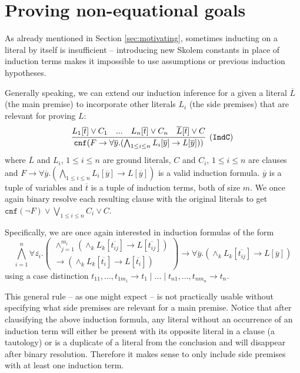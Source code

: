 
\section{Proving non-equational goals}
As already mentioned in Section \ref{sec:motivating}, sometimes inducting on a literal by itself is insufficient -- introducing new Skolem constants in place of induction terms makes it impossible to use assumptions or previous induction hypotheses.

Generally speaking, we can extend our induction inference for a given a literal $\overline{L}$ (the main premise) to incorporate other literals $L_i$ (the side premises) that are relevant for proving $L$:
\begin{equation*}\label{eq:multind}
\infer[\small{\tt (IndC)}]{\mathtt{cnf}(F \rightarrow \forall \overline{y}.(\bigwedge_{1\le i\le n}L_i[\overline{y}]\rightarrow L[\overline{y}]))}{L_1[\overline{t}]\lor C_1\quad...\quad L_n[\overline{t}]\lor C_n\quad\overline{L}[\overline{t}] \lor C}
\end{equation*}
where $\overline{L}$ and $L_i$, $1\le i\le n$ are ground literals, $C$ and $C_i$, $1\le i\le n$ are clauses and $F \rightarrow \forall \overline{y}.(\bigwedge_{1\le i\le n}L_i[\overline{y}]\rightarrow L[\overline{y}])$ is a valid induction formula. $\overline{y}$ is a tuple of variables and $\overline{t}$ is a tuple of induction terms, both of size $m$. We once again binary resolve each resulting clause with the original literals to get $\mathtt{cnf}(\lnot F) \lor\bigvee_{1\le i\le n} C_i\lor C$.

Specifically, we are once again interested in induction formulas of the form
$$\bigwedge_{i=1}^{n}\forall \overline{z_i}.\begin{pmatrix}\wedge_{j=1}^{m_i}(\wedge_kL_k[\overline{t_{ij}}]\rightarrow L[\overline{t_{ij}}])\\\rightarrow (\wedge_kL_k[\overline{t_i}]\rightarrow L[\overline{t_i}])\end{pmatrix}\rightarrow \forall \overline{y}.(\wedge_kL_k[\overline{t_{ij}}]\rightarrow L[\overline{y}])$$
using a case distinction $t_{11},...,t_{1{m_1}}\rightarrow t_1\mid...\mid t_{n1},...,t_{n{m_n}}\rightarrow t_n$.

This general rule -- as one might expect -- is not practically usable without specifying what side premises are relevant for a main premise. Notice that after clausifying the above induction formula, any literal without an occurrence of an induction term will either be present with its opposite literal in a clause (a tautology) or is a duplicate of a literal from the conclusion and will disappear after binary resolution. Therefore it makes sense to only include side premises with at least one induction term.

